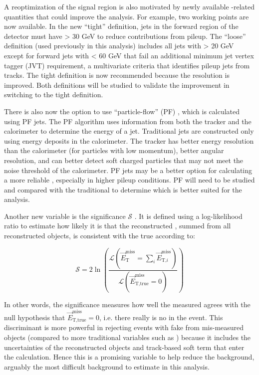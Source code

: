 A reoptimization of the signal region is also motivated by newly available \etmiss-related quantities that could improve the \monoZ analysis. For example, two \etmiss working points are now available. In the new ``tight'' \etmiss definition, jets in the forward region of the detector must have \pt > 30 GeV to reduce contributions from pileup. The ``loose'' definition (used previously in this analysis) includes all jets with \pt > 20 GeV except for forward jets with \pt < 60 GeV that fail an additional minimum jet vertex tagger (JVT) requirement, a multivariate criteria that identifies pileup jets from tracks. The tight definition is now recommended because the \etmiss resolution is improved. Both definitions will be studied to validate the improvement in switching to the tight definition.

There is also now the option to use ``particle-flow'' (PF) \etmiss, which is calculated using PF jets. The PF algorithm \cite{Sirunyan:2017ulk} uses information from both the tracker and the calorimeter to determine the energy of a jet. Traditional jets are constructed only using energy deposits in the calorimeter. The tracker has better energy resolution than the calorimeter (for particles with low momentum), better angular resolution, and can better detect soft charged particles that may not meet the noise threshold of the calorimeter. PF jets may be a better option for calculating a more reliable \etmiss, especially in higher pileup conditions. PF \etmiss will need to be studied and compared with the traditional \etmiss to determine which is better suited for the analysis.

Another new variable is the \etmiss significance $\mathcal{S}$ \cite{Schaefer:2294922}. It is defined using a log-likelihood ratio to estimate how likely it is that the reconstructed \etmissvec, summed from all reconstructed objects, is consistent with the true \etmissvec according to:

\begin{equation}
\mathcal{S} = 2 \ln \left( \frac{\mathcal{L}(\vec{E}_\text{T}^\text{miss} = \sum_i \vec{E}_{\text{T,}i}^\text{miss})}{\mathcal{L}(\vec{E}_\text{T,true}^\text{miss} = 0)} \right)
\end{equation}

\noindent In other words, the significance measures how well the measured \etmissvec agrees with the null hypothesis that $\vec{E}_\text{T,true}^\text{miss} = 0$, i.e. there really is no \etmiss in the event. This discriminant is more powerful in rejecting events with fake \etmiss from mis-measured objects (compared to more traditional variables such as \etmissht) because it includes the uncertainties of the reconstructed objects and track-based soft term that enter the \etmiss calculation. Hence this is a promising variable to help reduce the \Zjets background, arguably the most difficult background to estimate in this analysis.

